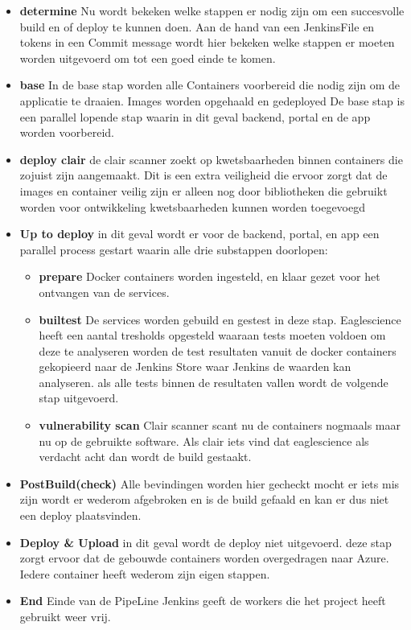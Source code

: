 \begin{itemize}
\item \textbf{determine} Nu wordt bekeken welke stappen er nodig zijn om een succesvolle build en of deploy te kunnen doen. Aan de hand van een JenkinsFile en tokens in een Commit message wordt hier bekeken welke stappen er moeten worden uitgevoerd om tot een goed einde te komen.
\item \textbf{base} In de base stap worden alle Containers voorbereid die nodig zijn om de applicatie te draaien. Images worden opgehaald en gedeployed De base stap is een parallel lopende stap waarin in dit geval backend, portal en de app worden voorbereid.
\item \textbf{deploy clair} de clair scanner zoekt op kwetsbaarheden binnen containers die zojuist zijn aangemaakt. Dit is een extra veiligheid die ervoor zorgt dat de images en container veilig zijn er alleen nog door bibliotheken die gebruikt worden voor ontwikkeling kwetsbaarheden kunnen worden toegevoegd
\item \textbf{Up to deploy}
in dit geval wordt er voor de backend, portal, en app een parallel process gestart waarin alle drie substappen doorlopen:
\begin{itemize}
\item \textbf{prepare} Docker containers worden ingesteld, en klaar gezet voor het ontvangen van de services.
\item \textbf{builtest} De services worden gebuild en gestest in deze stap. Eaglescience heeft een aantal tresholds opgesteld waaraan tests moeten voldoen om deze te analyseren worden de test resultaten vanuit de docker containers gekopieerd naar de Jenkins Store waar Jenkins de waarden kan analyseren. als alle tests binnen de resultaten vallen wordt de volgende stap uitgevoerd.
\item \textbf{vulnerability scan} Clair scanner scant nu de containers nogmaals maar nu op de gebruikte software. Als clair iets vind dat eaglescience als verdacht acht dan wordt de build gestaakt.
\end{itemize}
\item \textbf{PostBuild(check)}
Alle bevindingen worden hier gecheckt mocht er iets mis zijn wordt er wederom afgebroken en is de build gefaald en kan er dus niet een deploy plaatsvinden.
\item \textbf{Deploy \& Upload}
in dit geval wordt de deploy niet uitgevoerd. deze stap zorgt ervoor dat de gebouwde containers worden overgedragen naar Azure. Iedere container heeft wederom zijn eigen stappen.
\item \textbf{End}
Einde van de PipeLine Jenkins geeft de workers die het project heeft gebruikt weer vrij.
\end{itemize}

